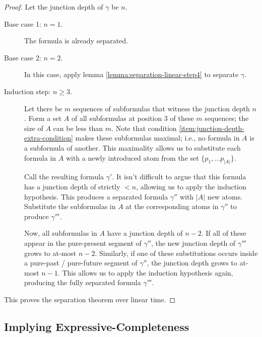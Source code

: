 \documentclass[a4paper,UKenglish,cleveref, autoref, thm-restate, numberwithinsect]{lipics-v2021}
\begin{document}
\begin{proof}
    Let the junction depth of $\gamma$ be $n$.
    \begin{description}
        \item[Base case 1: $n = 1$.] The formula is already separated.
        \item[Base case 2: $n = 2$.] In this case, apply lemma \ref{lemma:separation-linear-step4} to separate $\gamma$.
        \item[Induction step: $n \geq 3$.] Let there be $m$ sequences of subformulas that witness the junction depth $n$. Form a set $A$ of all subformulas at position 3 of these $m$ sequences; the size of $A$ can be less than $m$. Note that condition \ref{item:junction-depth-extra-condition} makes these subformulas maximal; i.e., no formula in $A$ is a subformula of another. This maximality allows us to substitute each formula in $A$ with a newly introduced atom from the set $\{p_1, \ldots p_{|A|}\}$.

        Call the resulting formula $\gamma'$. It isn't difficult to argue that this formula has a junction depth of strictly $< n$, allowing us to apply the induction hypothesis. This produces a separated formula $\gamma''$ with $|A|$ new atoms. Substitute the subformulas in $A$ at the corresponding atoms in $\gamma''$ to produce $\gamma'''$.

        Now, all subformulas in $A$ have a junction depth of $n - 2$. If all of these appear in the pure-present segment of $\gamma''$, the new junction depth of $\gamma'''$ grows to at-most $n - 2$. Similarly, if one of these substitutions occurs inside a pure-past / pure-future segment of $\gamma''$, the junction depth grows to at-most $n - 1$. This allows us to apply the induction hypothesis again, producing the fully separated formula $\gamma'''$.
    \end{description}
    This proves the separation theorem over linear time.
\end{proof}

\subsection{Implying Expressive-Completeness}
\end{document}
